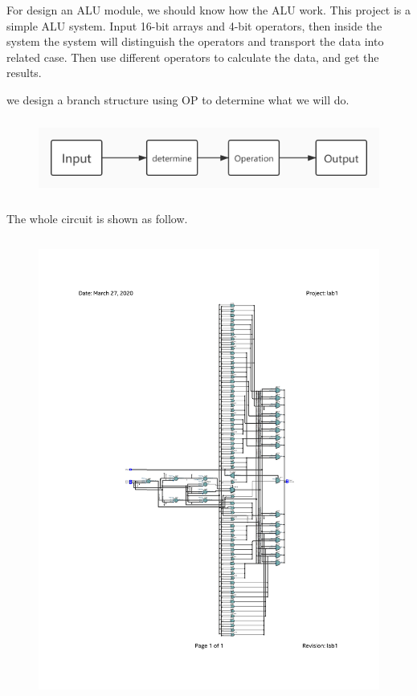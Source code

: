 \documentclass[12pt,a4paper]{article}
\begin{document}
For design an ALU module, we should know how the ALU work.
This project is a simple ALU system.
Input 16-bit arrays and 4-bit operators, then inside the system the system will distinguish the operators and transport the data into related case.
Then use different operators to calculate the data, and get the results.

we design a branch structure using OP to determine what we will do.
\begin{figure}[H]
  \centering
  \includegraphics[height=1in]{1.jpg}
  \end{figure}

The whole circuit is shown as follow.

\begin{figure}[H]
  \centering
  \includegraphics[height=6in]{lab1.pdf}
  \end{figure}


\newpage
\end{document}

